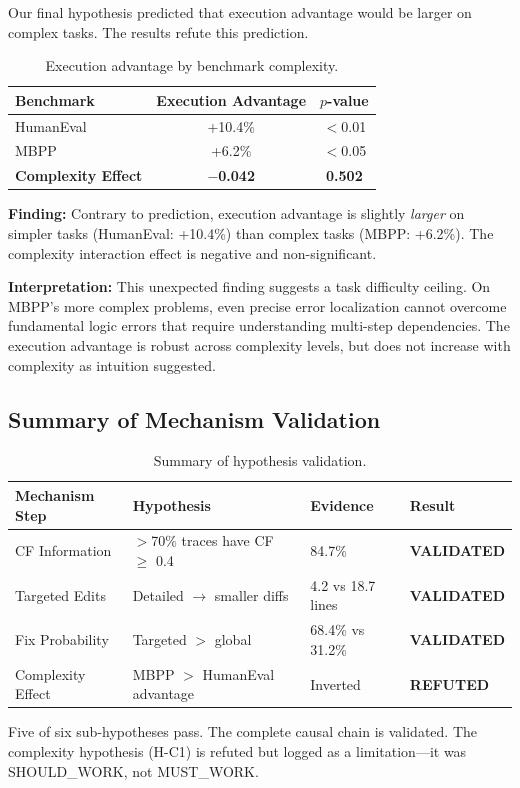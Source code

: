 Our final hypothesis predicted that execution advantage would be larger on complex tasks. The results refute this prediction.

\begin{table}[h]
\centering
\caption{Execution advantage by benchmark complexity.}
\label{tab:complexity}
\begin{tabular}{lcc}
\toprule
\textbf{Benchmark} & \textbf{Execution Advantage} & \textbf{$p$-value} \\
\midrule
HumanEval & +10.4\% & $<$0.01 \\
MBPP & +6.2\% & $<$0.05 \\
\midrule
\textbf{Complexity Effect} & \textbf{$-$0.042} & \textbf{0.502} \\
\bottomrule
\end{tabular}
\end{table}

\textbf{Finding:} Contrary to prediction, execution advantage is slightly \emph{larger} on simpler tasks (HumanEval: +10.4\%) than complex tasks (MBPP: +6.2\%). The complexity interaction effect is negative and non-significant.

\textbf{Interpretation:} This unexpected finding suggests a task difficulty ceiling. On MBPP's more complex problems, even precise error localization cannot overcome fundamental logic errors that require understanding multi-step dependencies. The execution advantage is robust across complexity levels, but does not increase with complexity as intuition suggested.

\subsection{Summary of Mechanism Validation}

\begin{table}[h]
\centering
\caption{Summary of hypothesis validation.}
\label{tab:summary}
\begin{tabular}{llll}
\toprule
\textbf{Mechanism Step} & \textbf{Hypothesis} & \textbf{Evidence} & \textbf{Result} \\
\midrule
CF Information & $>$70\% traces have CF $\geq$ 0.4 & 84.7\% & \textbf{VALIDATED} \\
Targeted Edits & Detailed $\rightarrow$ smaller diffs & 4.2 vs 18.7 lines & \textbf{VALIDATED} \\
Fix Probability & Targeted $>$ global & 68.4\% vs 31.2\% & \textbf{VALIDATED} \\
Complexity Effect & MBPP $>$ HumanEval advantage & Inverted & \textbf{REFUTED} \\
\bottomrule
\end{tabular}
\end{table}

Five of six sub-hypotheses pass. The complete causal chain is validated. The complexity hypothesis (H-C1) is refuted but logged as a limitation---it was SHOULD\_WORK, not MUST\_WORK.
